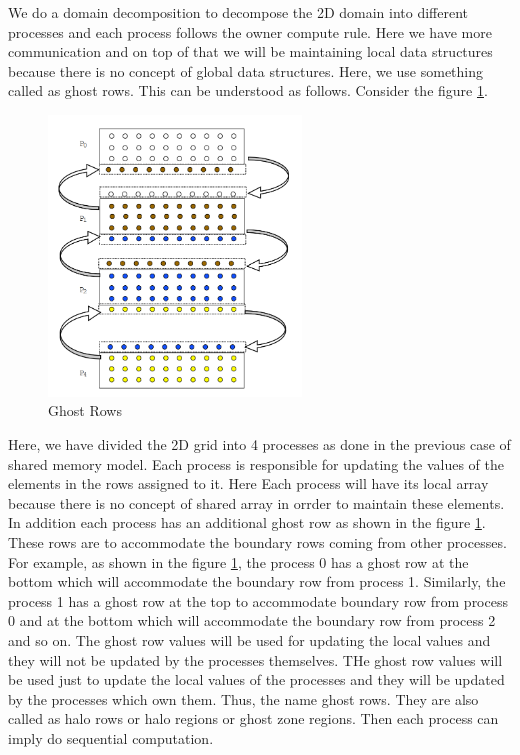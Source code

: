 \documentclass[12pt]{article}
\begin{document}
We do a domain decomposition to decompose the 2D domain into different processes and each process follows the owner compute rule.
Here we have more communication and on top of that we will be maintaining local data structures because there is no concept of global data structures.
Here, we use something called as ghost rows. This  can be understood as follows. Consider the figure \ref{fig:ghost}.
\begin{figure}[H]
    \centering
    \includegraphics[width=0.6\textwidth]{images/ghost.png}
    \caption{Ghost Rows}
    \label{fig:ghost}
\end{figure}
Here, we have divided the 2D grid into 4 processes as done in the previous case of shared memory model.
Each process is responsible for updating the values of the elements in the rows assigned to it.
Here Each process will have its local array because there is no concept of shared array in orrder to maintain these elements.
In addition each process has an additional ghost row as shown in the figure \ref{fig:ghost}.
These rows are to accommodate the boundary rows coming from other processes. For example, as shown in the figure \ref{fig:ghost},
the process 0 has a ghost row at the bottom which will accommodate the boundary row from process 1. Similarly, the process 1 has a ghost row at the top to accommodate boundary row from process 0
and at the bottom which will accommodate the boundary row from process 2 and so on.
The ghost row values will be used for updating the local values and they will not be updated by the processes themselves.
THe ghost row values will be used just to update the local values of the processes and they will be updated by the processes which own them.
Thus, the name ghost rows. They are also called as halo rows or halo regions or ghost zone regions.
Then each process can imply do sequential computation.
\end{document}
